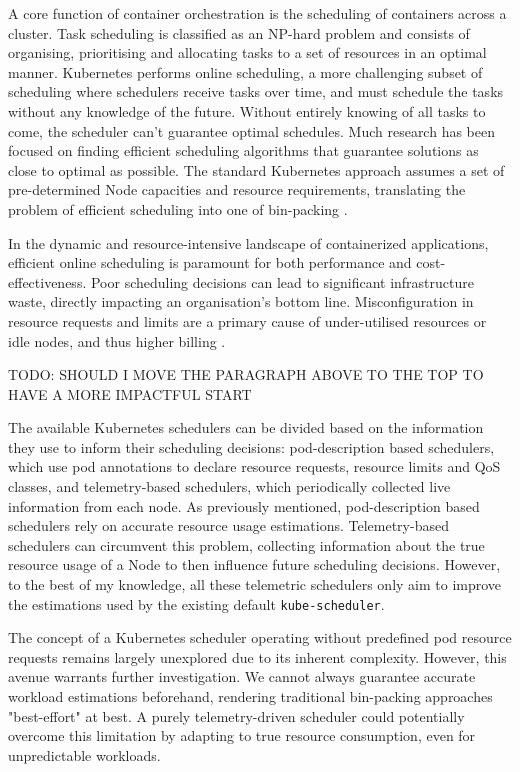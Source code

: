 A core function of container orchestration is the scheduling of containers
across a cluster. Task scheduling is classified as an NP-hard problem and
consists of organising, prioritising and allocating tasks to a set of resources
in an optimal manner. Kubernetes performs online scheduling, a more challenging
subset of scheduling \cite{pruhs2004online} where schedulers receive tasks over
time, and must schedule the tasks without any knowledge of the future. Without
entirely knowing of all tasks to come, the scheduler can't guarantee optimal
schedules. Much research has been focused on finding efficient scheduling
algorithms that guarantee solutions as close to optimal as possible. The
standard Kubernetes approach assumes a set of pre-determined Node capacities and
resource requirements, translating the problem of efficient scheduling into one
of bin-packing \cite{}.

In the dynamic and resource-intensive landscape of containerized applications,
efficient online scheduling is paramount for both performance and
cost-effectiveness. Poor scheduling decisions can lead to significant
infrastructure waste, directly impacting an organisation's bottom line.
Misconfiguration in resource requests and limits are a primary cause of
under-utilised resources or idle nodes, and thus higher billing
\cite{cost-strategies,
bin-packing-and-cost-savings-in-kubernetes-clusters-on-aws}.

TODO: SHOULD I MOVE THE PARAGRAPH ABOVE TO THE TOP TO HAVE A MORE IMPACTFUL
START

The available Kubernetes schedulers can be divided based on the information they
use to inform their scheduling decisions: pod-description based schedulers,
which use pod annotations to declare resource requests, resource limits and QoS classes,
and telemetry-based schedulers, which periodically collected live information
from each node. As previously mentioned, pod-description based schedulers rely on
accurate resource usage estimations. Telemetry-based schedulers can circumvent this
problem, collecting information about the true resource usage of a Node to then
influence future scheduling decisions. However, to the best of my knowledge,
all these telemetric schedulers only aim to improve the estimations used by the
existing default \texttt{kube-scheduler}.

The concept of a Kubernetes scheduler operating without predefined pod resource
requests remains largely unexplored due to its inherent complexity. However,
this avenue warrants further investigation. We cannot always guarantee accurate
workload estimations beforehand, rendering traditional bin-packing approaches
"best-effort" at best. A purely telemetry-driven scheduler could potentially
overcome this limitation by adapting to true resource consumption, even for
unpredictable workloads.

